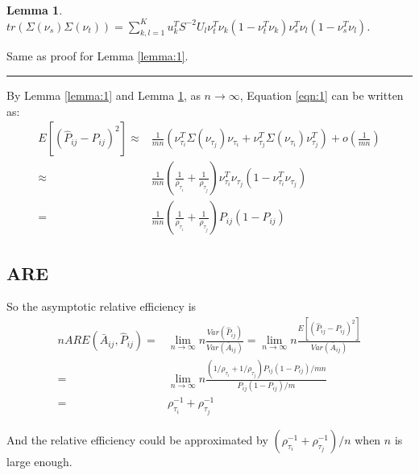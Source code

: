 \documentclass[a4paper]{article}
\newenvironment{proof}{{\bf Proof:  }}{\hfill\rule{2mm}{2mm}}
\newtheorem{lemma}[fact]{Lemma}
\begin{document}
\begin{lemma}
\label{lemma:2}
$tr(\Sigma(\nu_s) \Sigma(\nu_t)) = \sum_{k,l=1}^K u_k^T S^{-2} U_l \nu_t^T \nu_k (1 - \nu_t^T \nu_k) \nu_s^T \nu_l (1-\nu_s^T \nu_l)$.
\end{lemma}
\begin{proof}
Same as proof for Lemma \ref{lemma:1}.
\end{proof}



By Lemma \ref{lemma:1} and Lemma \ref{lemma:2}, as $n \rightarrow \infty$, Equation \ref{eqn:1} can be written as:
\begin{align}
	E[(\hat{P}_{ij} - P_{ij})^2] \approx &
    \frac{1}{m n} \left( \nu_{\tau_i}^T \Sigma(\nu_{\tau_j}) \nu_{\tau_i} + \nu_{\tau_j}^T \Sigma(\nu_{\tau_i}) \nu_{\tau_j}^T \right) 
    + o(\frac{1}{m n}) \\
    \approx & \frac{1}{mn} \left( \frac{1}{\rho_{\tau_i}} + \frac{1}{\rho_{\tau_j}} \right) \nu_{\tau_i}^T \nu_{\tau_j} (1-\nu_{\tau_i}^T \nu_{\tau_j}) \\
    = & \frac{1}{mn} \left( \frac{1}{\rho_{\tau_i}} + \frac{1}{\rho_{\tau_j}} \right) P_{ij} (1 - P_{ij})
    \label{eqn:2}
\end{align}



\subsection{ARE}
So the asymptotic relative efficiency is
\begin{align*}
	n ARE(\bar{A}_{ij}, \hat{P}_{ij}) = & \lim_{n \rightarrow \infty} n \frac{Var(\hat{P}_{ij})}{Var(\bar{A}_{ij})}
    = \lim_{n \rightarrow \infty} n \frac{E[(\hat{P}_{ij} - P_{ij})^2]}{Var(\bar{A}_{ij})} \\
    = & \lim_{n \rightarrow \infty}
    n \frac{\left( 1/\rho_{\tau_i} + 1/\rho_{\tau_j} \right) P_{ij} (1-P_{ij})/mn}
    {P_{ij} (1-P_{ij})/m} \\
    = & \rho_{\tau_i}^{-1} + \rho_{\tau_j}^{-1}
\end{align*}

And the relative efficiency could be approximated by $\left( \rho_{\tau_i}^{-1} + \rho_{\tau_j}^{-1}\right)/n$ when $n$ is large enough.
\end{document}
